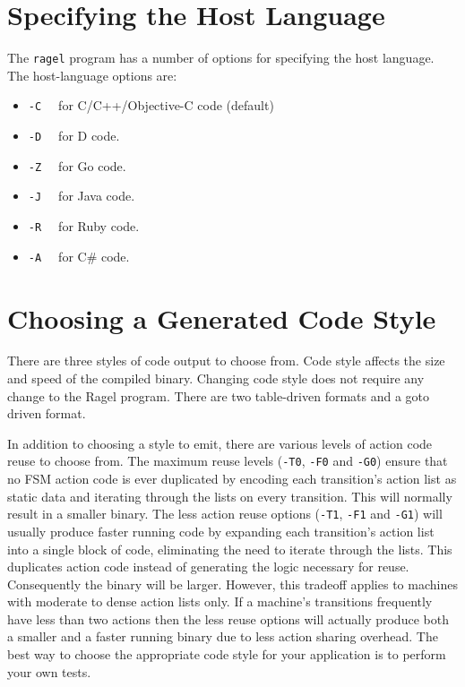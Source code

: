 \documentclass[letterpaper,11pt,oneside]{book}
\begin{document}
\section{Specifying the Host Language}

The \verb|ragel| program has a number of options for specifying the host
language. The host-language options are:

\begin{itemize}
\item \verb|-C  | for C/C++/Objective-C code (default)
\item \verb|-D  | for D code.
\item \verb|-Z  | for Go code.
\item \verb|-J  | for Java code.
\item \verb|-R  | for Ruby code.
\item \verb|-A  | for C\# code.
\end{itemize}

\section{Choosing a Generated Code Style}
\label{genout}

There are three styles of code output to choose from. Code style affects the
size and speed of the compiled binary. Changing code style does not require any
change to the Ragel program. There are two table-driven formats and a goto
driven format.

In addition to choosing a style to emit, there are various levels of action
code reuse to choose from.  The maximum reuse levels (\verb|-T0|, \verb|-F0|
and \verb|-G0|) ensure that no FSM action code is ever duplicated by encoding
each transition's action list as static data and iterating
through the lists on every transition. This will normally result in a smaller
binary. The less action reuse options (\verb|-T1|, \verb|-F1| and \verb|-G1|)
will usually produce faster running code by expanding each transition's action
list into a single block of code, eliminating the need to iterate through the
lists. This duplicates action code instead of generating the logic necessary
for reuse. Consequently the binary will be larger. However, this tradeoff applies to
machines with moderate to dense action lists only. If a machine's transitions
frequently have less than two actions then the less reuse options will actually
produce both a smaller and a faster running binary due to less action sharing
overhead. The best way to choose the appropriate code style for your
application is to perform your own tests.
\end{document}
